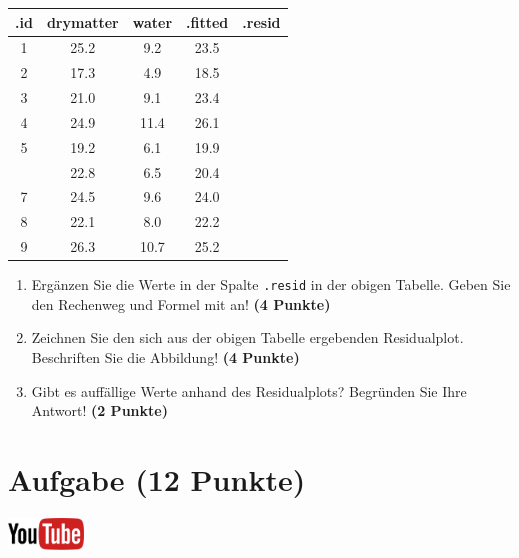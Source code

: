 \documentclass[a4paper, 9pt]{scrartcl}\usepackage[]{graphicx}\usepackage[]{xcolor}
\newenvironment{knitrout}{}{} %
\begin{document}
\begin{knitrout}
\color{fgcolor}\begin{table}[!h]
\centering\begingroup\fontsize{12}{14}\selectfont

\begin{tabular}{ccccc}
\toprule
.id & drymatter & water & .fitted & .resid\\
\midrule
1 & 25.2 & 9.2 & 23.5 & \\
2 & 17.3 & 4.9 & 18.5 & \\
3 & 21.0 & 9.1 & 23.4 & \\
4 & 24.9 & 11.4 & 26.1 & \\
5 & 19.2 & 6.1 & 19.9 & \\
\addlinespace
6 & 22.8 & 6.5 & 20.4 & \\
7 & 24.5 & 9.6 & 24.0 & \\
8 & 22.1 & 8.0 & 22.2 & \\
9 & 26.3 & 10.7 & 25.2 & \\
\bottomrule
\end{tabular}
\endgroup{}
\end{table}

\end{knitrout}

\begin{enumerate}
\item Erg{\"a}nzen Sie die Werte in der Spalte \texttt{.resid} in der obigen
  Tabelle. Geben Sie den Rechenweg und Formel mit an! \textbf{(4 Punkte)}
\item Zeichnen Sie den sich aus der obigen Tabelle ergebenden
  Residualplot. Beschriften Sie die Abbildung! \textbf{(4 Punkte)}
\item Gibt es auff{\"a}llige Werte anhand des Residualplots? Begr{\"u}nden Sie Ihre
  Antwort! \textbf{(2 Punkte)}
\end{enumerate}
 
\clearpage

\section{Aufgabe \hfill (12 Punkte)}

\hfill\href{https://youtu.be/lHzRgm7hPw0}{\includegraphics[width =
  2cm]{img/youtube}}\\[1Ex]
\end{document}
